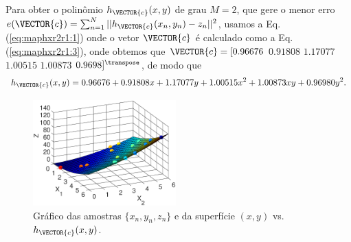 \begin{SolutionT}\label{sol:theo:maphxr2r1}
Para obter o polinômio $h_{\VECTOR{c}}(x,y)$ de grau $M=2$, 
que gere o menor erro $e(\VECTOR{c}) =  \sum_{n=1}^{N} ||h_{\VECTOR{c}}(x_n,y_n)-z_n||^2$,
usamos a Eq. (\ref{eq:maphxr2r1:1}) onde o vetor $\VECTOR{c}$ é calculado como a Eq. (\ref{eq:maphxr2r1:3}),
onde obtemos que $\VECTOR{c}=[0.96676$ $0.91808$ $1.17077$ $1.00515$ $1.00873$ $0.9698]^{\transpose}$, de modo que
\begin{equation}
h_{\VECTOR{c}}(x,y) =   0.96676 +0.91808 x +1.17077 y +1.00515 x^2 +1.00873 xy +0.96980 y^2.
\end{equation}
    \begin{figure}[!h]
        \centering
        \includegraphics[width=0.49\textwidth]{chapters/mapeamento/mfiles/mapeamentor2r1/minimizando_hx.eps}
        \caption{Gráfico das amostras $\{x_n,y_n,z_n\}$ e da superfície $(x,y)$ vs. $h_{\VECTOR{c}}(x,y)$.}
        \label{fig:theo:maphxr2r1:xnyn}
    \end{figure}

\end{SolutionT}



